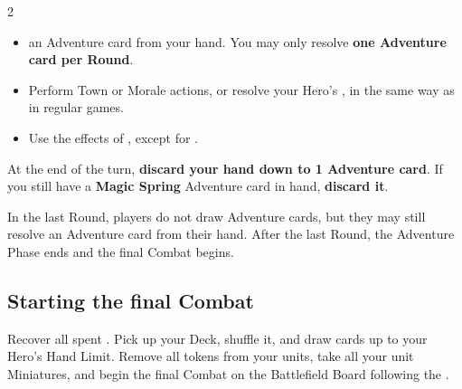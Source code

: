 \begin{expansion}
\begin{multicols}{2}
\begin{enumerate}[leftmargin=1.3em]
    \begin{itemize}
      \item {} an Adventure card from your hand.
        You may only resolve \textbf{one Adventure card per Round}.
      \item Perform Town or Morale actions, or resolve your Hero's , in the same way as in regular games.  %
      \item Use the effects of , except for .
    \end{itemize}\par
    At the end of the turn, \textbf{discard your hand down to 1 Adventure card}.
    If you still have a \textbf{Magic Spring} Adventure card in hand, \textbf{discard it}.
  \end{enumerate}\par
  \smallskip
  In the last Round, players do not draw Adventure cards, but they may still resolve an Adventure card from their hand.
  After the last Round, the Adventure Phase ends and the final Combat begins.

  \subsection*{Starting the final Combat}
  Recover all spent .
  Pick up your Deck, shuffle it, and draw cards up to your Hero's Hand  Limit.
  Remove all  tokens from your units, take all your unit Miniatures, and begin the final Combat on the Battlefield Board following the .
  \end{multicols}
\end{expansion}

